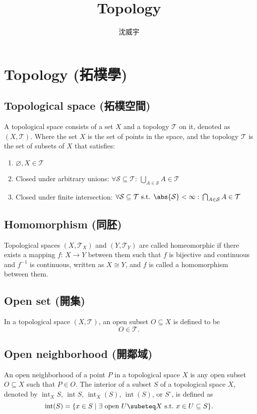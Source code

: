 \documentclass[a4paper,12pt]{article}
\begin{document}
\title{Topology}
\author{沈威宇}
\date{\temtoday}
\titletocdoc
\section{Topology (拓樸學)}
\subsection{Topological space (拓樸空間)}
A topological space consists of a set $X$ and a topology $\mathcal{T}$ on it, denoted as \( (X, \mathcal{T}) \). Where the set \( X \) is the set of points in the space, and the topology \( \mathcal{T} \) is the set of subsets of \( X \) that satisfies:
\begin{enumerate}
\item \(\varnothing,X\in\mathcal{T} \)
\item Closed under arbitrary unions: \(\forall\mathcal{S}\subseteq\mathcal{T}:\,\bigcup_{A\in\mathcal{S}}A\in\mathcal{T}\)
\item Closed under finite intersection: \(\forall\mathcal{S}\subseteq\mathcal{T}\text{ s.t. }\abs{\mathcal{S}}<\infty:\,\bigcap_{A\in\mathcal{S}}A\in\mathcal{T}\)
\end{enumerate}
\subsection{Homomorphism (同胚)}
Topological spaces $(X,\mathcal{T}_X)$ and $(Y,\mathcal{T}_Y)$ are called homeomorphic if there exists a mapping $f:\,X\to Y$ between them such that $f$ is bijective and continuous and $f^{-1}$ is continuous, written as \( X \cong Y \), and $f$ is called a homomorphism between them.
\subsection{Open set (開集)}
In a topological space \( (X, \mathcal{T}) \), an open subset \( O \subseteq X \) is defined to be
\[O\in \mathcal{T}.\]
\subsection{Open neighborhood (開鄰域)}
An open neighborhood of a point $P$ in a topological space $X$ is any open subset $O\subseteq X$ such that $P\in O$.
The interior of a subset $S$ of a topological space $X$, denoted by $\operatorname{int}_XS$, $\operatorname{int}S$, $\operatorname{int}_X(S)$, $\operatorname{int}(S)$, or $S^{\circ}$, is defined as
\[\operatorname{int}(S) = \{ x \in S \mid \exists \text{\ open\ } U\subeteq X \text{\ s.t.\ } x \in U \subseteq S \}.\]
\end{document}
